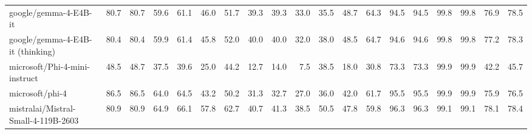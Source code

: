 \documentclass{article}
\begin{document}
\begin{table}[htbp]
\begin{threeparttable}
\begin{adjustbox}{max width=\textwidth}
\begin{tabular}{lrrrrrrrrrrrrrrrrrr}
google/gemma-4-E4B-it & \cellcolor[HTML]{C7E1EE}80.7 & \cellcolor[HTML]{C7E1EE}80.7 & \cellcolor[HTML]{EBF4F9}59.6 & \cellcolor[HTML]{E9F3F8}61.1 & \cellcolor[HTML]{FDF0EA}46.0 & \cellcolor[HTML]{FDF4F0}51.7 & \cellcolor[HTML]{D7EAF3}39.3 & \cellcolor[HTML]{D8EAF3}39.3 & \cellcolor[HTML]{DBECF4}33.0 & \cellcolor[HTML]{FEFCFB}35.5 & \cellcolor[HTML]{CCE3EF}48.7 & \cellcolor[HTML]{B4D7E8}64.3 & \cellcolor[HTML]{9FCCE2}94.5 & \cellcolor[HTML]{A0CCE2}94.5 & \cellcolor[HTML]{92C5DE}99.8 & \cellcolor[HTML]{92C5DE}99.8 & \cellcolor[HTML]{C0DDEC}76.9 & \cellcolor[HTML]{BEDCEB}78.5 \\
google/gemma-4-E4B-it (thinking) & \cellcolor[HTML]{C8E2EE}80.4 & \cellcolor[HTML]{C9E2EE}80.4 & \cellcolor[HTML]{EAF4F8}59.9 & \cellcolor[HTML]{E9F3F8}61.4 & \cellcolor[HTML]{FDEFE9}45.8 & \cellcolor[HTML]{FDF5F1}52.0 & \cellcolor[HTML]{D4E8F2}40.0 & \cellcolor[HTML]{D5E8F2}40.0 & \cellcolor[HTML]{E0EEF5}32.0 & \cellcolor[HTML]{F2F8FB}38.0 & \cellcolor[HTML]{CDE4EF}48.5 & \cellcolor[HTML]{B2D6E7}64.7 & \cellcolor[HTML]{9FCCE2}94.6 & \cellcolor[HTML]{9FCCE2}94.6 & \cellcolor[HTML]{92C5DE}99.8 & \cellcolor[HTML]{92C5DE}99.8 & \cellcolor[HTML]{BFDDEB}77.2 & \cellcolor[HTML]{BFDCEB}78.3 \\
microsoft/Phi-4-mini-instruct & \cellcolor[HTML]{F4A582}48.5 & \cellcolor[HTML]{F4A582}48.7 & \cellcolor[HTML]{FBE0D4}37.5 & \cellcolor[HTML]{FBE1D5}39.6 & \cellcolor[HTML]{F5B091}25.0 & \cellcolor[HTML]{FADACC}44.2 & \cellcolor[HTML]{F6BBA1}12.7 & \cellcolor[HTML]{F7BEA5}14.0 & \cellcolor[HTML]{F6BBA1}7.5 & \cellcolor[HTML]{EEF6FA}38.5 & \cellcolor[HTML]{F4A582}18.0 & \cellcolor[HTML]{F5AE8F}30.8 & \cellcolor[HTML]{D5E8F2}73.3 & \cellcolor[HTML]{D5E9F2}73.3 & \cellcolor[HTML]{92C5DE}99.9 & \cellcolor[HTML]{92C5DE}99.9 & \cellcolor[HTML]{FCEBE3}42.2 & \cellcolor[HTML]{FDF1EC}45.7 \\
microsoft/phi-4 & \cellcolor[HTML]{A9D1E5}86.5 & \cellcolor[HTML]{A9D1E5}86.5 & \cellcolor[HTML]{E0EEF5}64.0 & \cellcolor[HTML]{E1EFF5}64.5 & \cellcolor[HTML]{FCE8DF}43.2 & \cellcolor[HTML]{FDEFE9}50.2 & \cellcolor[HTML]{FBFDFE}31.3 & \cellcolor[HTML]{F7FAFC}32.7 & \cellcolor[HTML]{F6FAFC}27.0 & \cellcolor[HTML]{FFFFFF}36.0 & \cellcolor[HTML]{EEF6FA}42.0 & \cellcolor[HTML]{C1DEEC}61.7 & \cellcolor[HTML]{9DCBE1}95.5 & \cellcolor[HTML]{9DCBE1}95.5 & \cellcolor[HTML]{92C5DE}99.9 & \cellcolor[HTML]{92C5DE}99.9 & \cellcolor[HTML]{C3DFEC}75.9 & \cellcolor[HTML]{C3DFEC}76.5 \\
mistralai/Mistral-Small-4-119B-2603 & \cellcolor[HTML]{C6E0ED}80.9 & \cellcolor[HTML]{C6E0ED}80.9 & \cellcolor[HTML]{DDEDF4}64.9 & \cellcolor[HTML]{DCECF4}66.1 & \cellcolor[HTML]{E5F1F7}57.8 & \cellcolor[HTML]{DDEDF4}62.7 & \cellcolor[HTML]{D1E6F1}40.7 & \cellcolor[HTML]{CFE5F0}41.3 & \cellcolor[HTML]{C2DEEC}38.5 & \cellcolor[HTML]{A2CDE2}50.5 & \cellcolor[HTML]{D0E6F0}47.8 & \cellcolor[HTML]{CBE3EF}59.8 & \cellcolor[HTML]{9BC9E0}96.3 & \cellcolor[HTML]{9BCAE0}96.3 & \cellcolor[HTML]{93C6DE}99.1 & \cellcolor[HTML]{93C6DE}99.1 & \cellcolor[HTML]{BDDCEB}78.1 & \cellcolor[HTML]{BEDCEB}78.4 \\

\end{tabular}
\end{adjustbox}
\end{threeparttable}
\end{table}
\end{document}
